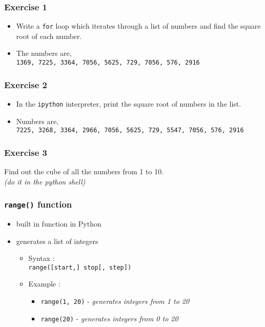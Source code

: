 \documentclass[17pt,compress]{beamer}
\begin{document}
\begin{frame}[fragile]
\frametitle{Exercise 1}
\begin{itemize}
\item Write a \texttt{for} loop which iterates through a list of numbers and find
  the square root of each number.\pause
\item The numbers are,\pause\\
\texttt{1369, 7225, 3364, 7056, 5625, 729, 7056, 576, 2916}
\end{itemize}
\end{frame}
\begin{frame}[fragile]
\frametitle{Exercise 2}
\begin{itemize}
\item In the \texttt{ipython} interpreter, print the square root of numbers in the list.\pause
\item Numbers are,\pause\\
\texttt{7225, 3268, 3364, 2966, 7056,
5625, 729, 5547, 7056, 576, 2916}
\end{itemize}

\end{frame}
\begin{frame}[fragile]
\frametitle{Exercise 3}
  Find out the cube of all the numbers from 1 to 10. \\
  \emph{(do it in the python shell)}
\end{frame}
\begin{frame}
\frametitle{\texttt{range()} function}
    \begin{itemize}
    \item built in function in Python\pause
    \item generates a list of integers\pause
        \begin{itemize}
        \item Syntax :\\ \texttt{range([start,] stop[, step])}\pause
        \item Example :
            \begin{itemize}
            \item \texttt{range(1, 20)} - \emph{generates integers from 1 to 20}\pause
            \item \texttt{range(20)} - \emph{generates integers from 0 to 20}
            \end{itemize}
        \end{itemize}
    \end{itemize}
\end{frame}
\end{document}
